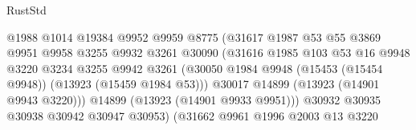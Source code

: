 \begin{lexlean}{RustStd}
\begin{coremodule}
                                          @1988
                                          @1014
                                          @19384
                                          @9952
                                          @9959
                                          @8775
                                          (@31617
                                            @1987
                                            @53
                                            @55
                                            @3869
                                            @9951
                                            @9958
                                            @3255
                                            @9932
                                            @3261
                                            @30090
                                            (@31616
                                              @1985
                                              @103
                                              @53
                                              @16
                                              @9948
                                              @3220
                                              @3234
                                              @3255
                                              @9942
                                              @3261
                                              (@30050
                                                @1984
                                                @9948
                                                (@15453 (@15454 @9948))
                                                (@13923 (@15459 @1984 @53)))
                                              @30017
                                              @14899
                                              (@13923 (@14901 @9943 @3220)))
                                            @14899
                                            (@13923 (@14901 @9933 @9951)))
                                          @30932
                                          @30935
                                          @30938
                                          @30942
                                          @30947
                                          @30953)
                                        (@31662
                                          @9961
                                          @1996
                                          @2003
                                          @13
                                          @3220

\end{coremodule}
\end{lexlean}
